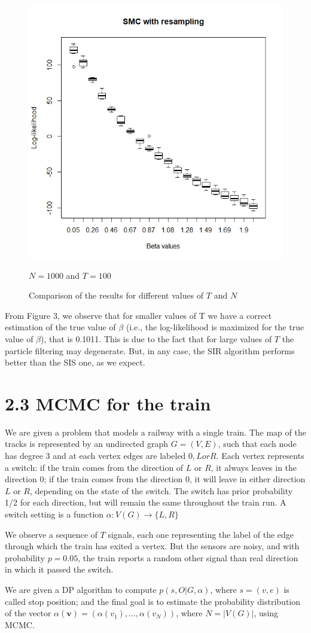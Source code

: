 \documentclass[]{article}
\begin{document}
\begin{figure}
\begin{center}
		\includegraphics[width=.4\textwidth]{task1/SIR_N_1000_T_100.jpeg}
		\caption*{$N=1000$ and $T=100$}
	\end{center}
	\caption{Comparison of the results for different values of $T$ and $N$}
\end{figure}

From Figure 3, we observe that for smaller values of T we have a correct estimation of the true value of $\beta$ (i.e., the log-likelihood is maximized for the true value of $\beta$), that is 0.1011. This is due to the fact that for large values of $T$ the particle filtering may degenerate. But, in any case, the SIR algorithm performs better than the SIS one, as we expect. 



\section*{2.3 MCMC for the train}
We are given a problem that models a railway with a single train. The map of the tracks is represented by an undirected graph $G=(V,E)$, such that each node has degree 3 and at each vertex edges are labeled $0, L or R$. Each vertex represents a switch: if the train comes from the direction of $L$ or $R$, it always leaves in the direction 0; if the train comes from the direction $0$, it will leave in either direction $L$ or $R$, depending on the state of the switch. The switch has prior probability 1/2 for each direction, but will remain the same throughout the train run. A switch setting is a function $\alpha : V(G) \rightarrow \{L,R\}$

We observe a sequence of $T$ signals, each one representing the label of the edge through which the train has exited a vertex. But the sensors are noisy, and with probability $p = 0.05$, the train reports a random other signal than real direction in which it passed the switch. 

We are given a DP algorithm to compute $p(s,O|G,\alpha)$, where $s=(v,e)$ is called stop position; and the final goal is to estimate the probability distribution of the vector $\alpha(\mathbf{v}) = (\alpha(v_1), ..., \alpha(v_N))$,  where $ N=|V(G)| $, using MCMC.
\end{document}
